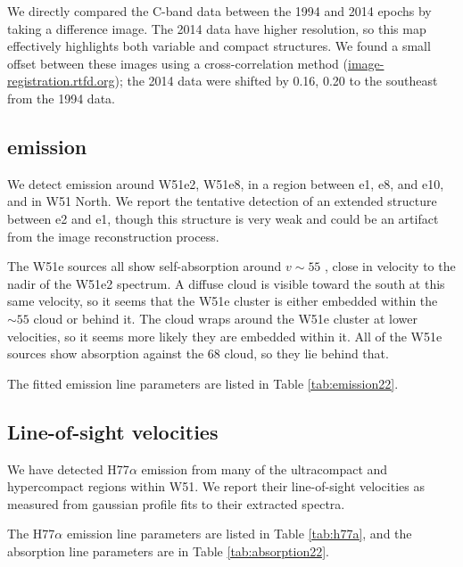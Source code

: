 We directly compared the C-band data between the 1994 and 2014 epochs by taking
a difference image.  The 2014 data have higher resolution, so this map
effectively highlights both variable and compact structures.  We found a small
offset between these images using a cross-correlation method
(\url{image-registration.rtfd.org}); the 2014 data were shifted by 0.16, 0.20
\arcsec to the southeast from the 1994 data.

\subsection{\formaldehyde \twotwo emission}
We detect \formaldehyde \twotwo emission around W51e2, W51e8, in a region
between e1, e8, and e10, and in W51 North.  We report the tentative detection
of an extended structure between e2 and e1, though this structure is very weak
and could be an artifact from the image reconstruction process.

The W51e sources all show self-absorption around $v\sim55$ \kms, close in
velocity to the nadir of the W51e2 spectrum.  A diffuse cloud is visible toward
the south at this same velocity, so it seems that the W51e cluster is either
embedded within the $\sim55$ \kms cloud or behind it.  The cloud wraps around
the W51e cluster at lower velocities, so it seems more likely they are embedded
within it.  All of the W51e sources show absorption against the 68 \kms cloud,
so they lie behind that.

The fitted emission line parameters are listed in Table \ref{tab:emission22}.




\subsection{Line-of-sight velocities}
We have detected H77$\alpha$ emission from many of the ultracompact and
hypercompact \hii regions within W51.  We report their line-of-sight velocities
as measured from gaussian profile fits to their extracted spectra.

The H77$\alpha$ emission line parameters are listed in Table \ref{tab:h77a}, and
the \para \twotwo absorption line parameters are in Table \ref{tab:absorption22}.





